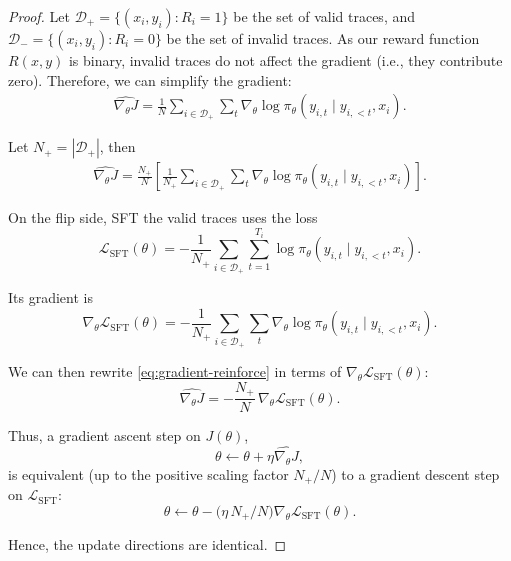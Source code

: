 \begin{proof}
Let $\mathcal{D}_+ = \{(x_i,y_i) : R_i = 1\}$ be the set of valid traces, and $\mathcal{D}_- = \{(x_i,y_i) : R_i = 0\}$ be the set of invalid traces.
As our reward function $R(x,y)$ is binary, invalid traces do not affect the gradient (i.e., they contribute zero). Therefore, we can simplify the gradient:
\begin{align*}
\widehat{\nabla_\theta J} =
\frac{1}{N} \sum_{i \in \mathcal{D}_+}
\sum_t \nabla_\theta
\log \pi_\theta(y_{i,t} \mid y_{i,<t}, x_i).
\end{align*}

Let $N_+ = |\mathcal{D}_+|$, then
\begin{align}
\widehat{\nabla_\theta J}
=
\frac{N_+}{N}
\left[
\frac{1}{N_+}
\sum_{i \in \mathcal{D}_+}
\sum_t \nabla_\theta \log \pi_\theta(y_{i,t}\mid y_{i,<t},x_i)
\right].
\label{eq:gradient-reinforce}
\end{align}

On the flip side, SFT the valid traces uses the loss
\[
\mathcal{L}_{\text{SFT}}(\theta)
=
- \frac{1}{N_+}
\sum_{i\in \mathcal{D}_+}
\sum_{t=1}^{T_i}
\log \pi_\theta(y_{i,t} \mid y_{i,<t}, x_i).
\]

Its gradient is
\[
\nabla_\theta \mathcal{L}_{\text{SFT}}(\theta)
=
-
\frac{1}{N_+}
\sum_{i\in \mathcal{D}_+}
\sum_t
\nabla_\theta \log \pi_\theta(y_{i,t} \mid y_{i,<t}, x_i).
\]

We can then rewrite \eqref{eq:gradient-reinforce} in terms of $\nabla_\theta
\mathcal{L}_{\text{SFT}}(\theta)$:
\[
\widehat{\nabla_\theta J}
=
- \frac{N_+}{N} \,
\nabla_\theta \mathcal{L}_{\text{SFT}}(\theta).
\]

Thus, a gradient ascent step on $J(\theta)$,
\[
\theta \leftarrow
\theta + \eta \widehat{\nabla_\theta J},
\]
is equivalent (up to the positive scaling factor $N_+/N$) to a gradient
descent step on $\mathcal{L}_{\text{SFT}}$:
\[
\theta \leftarrow
\theta - \bigl(\eta\,N_+/N \bigr)
\nabla_\theta \mathcal{L}_{\text{SFT}}(\theta).
\]

Hence, the update directions are identical.
\end{proof}


